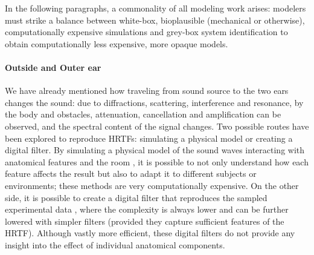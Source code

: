 \documentclass[11pt,a4paper]{article}
\begin{document}
In the following paragraphs, a commonality of all modeling work arises: modelers must strike a balance between white-box, bioplausible (mechanical or otherwise), computationally expensive simulations and grey-box system identification to obtain computationally less expensive, more opaque models.

\paragraph{Outside and Outer ear}
We have already mentioned how traveling from sound source to the two ears changes the sound: due to diffractions, scattering, interference and resonance, by the body and obstacles, attenuation, cancellation and amplification can be observed, and the spectral content of the signal changes. Two possible routes have been explored to reproduce HRTFs: simulating a physical model or creating a digital filter. By simulating a physical model of the sound waves interacting with anatomical features and the room \cite{walshBoundaryElementModeling2004}, it is possible to not only understand how each feature affects the result but also to adapt it to different subjects or environments; these methods are very computationally expensive. On the other side, it is possible to create a digital filter that reproduces the sampled experimental data \cite{kulkarniInfiniteimpulseresponseModelsHeadrelated2004}, where the complexity is always lower and can be further lowered with simpler filters (provided they capture sufficient features of the HRTF). Although vastly more efficient, these digital filters do not provide any insight into the effect of individual anatomical components.
\end{document}
